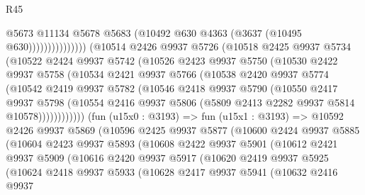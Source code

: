 \begin{lexlean}{R45}
\begin{coremodule}
                                @5673
                                @11134
                                @5678
                                @5683
                                (@10492 @630 @4363 (@3637 (@10495 @630)))))))))))))))
        (@10514
          @2426
          @9937
          @5726
          (@10518
            @2425
            @9937
            @5734
            (@10522
              @2424
              @9937
              @5742
              (@10526
                @2423
                @9937
                @5750
                (@10530
                  @2422
                  @9937
                  @5758
                  (@10534
                    @2421
                    @9937
                    @5766
                    (@10538
                      @2420
                      @9937
                      @5774
                      (@10542
                        @2419
                        @9937
                        @5782
                        (@10546
                          @2418
                          @9937
                          @5790
                          (@10550
                            @2417
                            @9937
                            @5798
                            (@10554
                              @2416
                              @9937
                              @5806
                              (@5809 @2413 @2282 @9937 @5814 @10578))))))))))))
        (fun (u15x0 : @3193) =>
        fun (u15x1 : @3193) =>
        @10592
          @2426
          @9937
          @5869
          (@10596
            @2425
            @9937
            @5877
            (@10600
              @2424
              @9937
              @5885
              (@10604
                @2423
                @9937
                @5893
                (@10608
                  @2422
                  @9937
                  @5901
                  (@10612
                    @2421
                    @9937
                    @5909
                    (@10616
                      @2420
                      @9937
                      @5917
                      (@10620
                        @2419
                        @9937
                        @5925
                        (@10624
                          @2418
                          @9937
                          @5933
                          (@10628
                            @2417
                            @9937
                            @5941
                            (@10632
                              @2416
                              @9937

\end{coremodule}
\end{lexlean}
